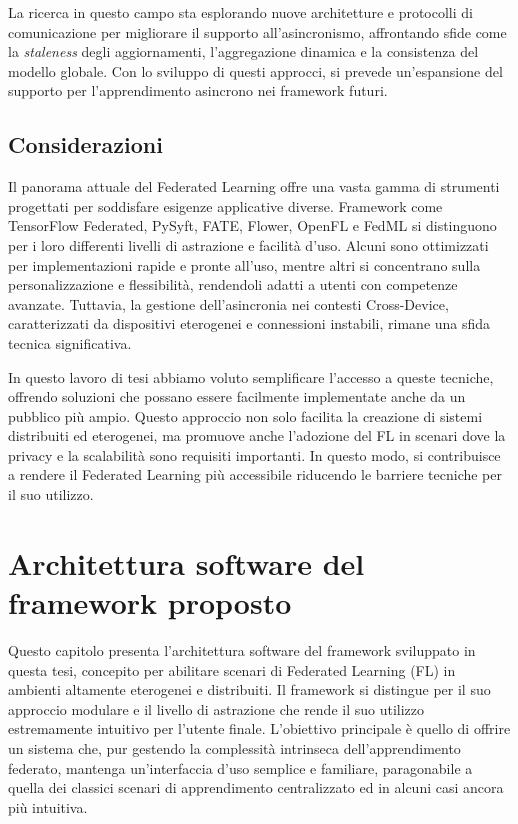 \documentclass[a4paper, oneside, openright]{report}
\let\oldsection\section
\renewcommand{\section}{\newpage\oldsection}
\begin{document}
La ricerca in questo campo sta esplorando nuove architetture e protocolli di comunicazione per migliorare il supporto all'asincronismo, affrontando sfide come la \textit{staleness} degli aggiornamenti, l'aggregazione dinamica e la consistenza del modello globale. Con lo sviluppo di questi approcci, si prevede un'espansione del supporto per l'apprendimento asincrono nei framework futuri.

\section{Considerazioni}
Il panorama attuale del Federated Learning offre una vasta gamma di strumenti progettati per soddisfare esigenze applicative diverse. Framework come TensorFlow Federated, PySyft, FATE, Flower, OpenFL e FedML si distinguono per i loro differenti livelli di astrazione e facilità d'uso. Alcuni sono ottimizzati per implementazioni rapide e pronte all'uso, mentre altri si concentrano sulla personalizzazione e flessibilità, rendendoli adatti a utenti con competenze avanzate. Tuttavia, la gestione dell'asincronia nei contesti Cross-Device, caratterizzati da dispositivi eterogenei e connessioni instabili, rimane una sfida tecnica significativa.

In questo lavoro di tesi abbiamo voluto semplificare l'accesso a queste tecniche, offrendo soluzioni che possano essere facilmente implementate anche da un pubblico più ampio. Questo approccio non solo facilita la creazione di sistemi distribuiti ed eterogenei, ma promuove anche l'adozione del FL in scenari dove la privacy e la scalabilità sono requisiti importanti. In questo modo, si contribuisce a rendere il Federated Learning più accessibile riducendo le barriere tecniche per il suo utilizzo.


%
\clearpage{}
\clearpage{}\chapter{Architettura software del framework proposto}\label{chap:architettura}
Questo capitolo presenta l'architettura software del framework sviluppato in questa tesi, concepito per abilitare scenari di Federated Learning (FL) in ambienti altamente eterogenei e distribuiti. Il framework si distingue per il suo approccio modulare e il livello di astrazione che rende il suo utilizzo estremamente intuitivo per l'utente finale. L'obiettivo principale è quello di offrire un sistema che, pur gestendo la complessità intrinseca dell'apprendimento federato, mantenga un'interfaccia d'uso semplice e familiare, paragonabile a quella dei classici scenari di apprendimento centralizzato ed in alcuni casi ancora più intuitiva.
\end{document}

